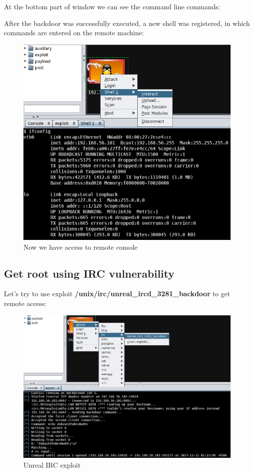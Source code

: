 \documentclass[14pt,a4paper,report]{report}
\begin{document}
At the bottom part of window we can see the command line commands:



\clearpage

After the backdoor was successfully executed, a new shell was registered, in which commands are entered on the remote machine:

\begin{figure}[h!]
	\centering
	\includegraphics[scale = 0.60]{images/7.png}
	\caption{Now we have access to remote console}
\end{figure}

\subsection{Get root using IRC vulnerability}

Let's try to use exploit \textbf{/unix/irc/unreal\_ircd\_3281\_backdoor} to get remote access:

\begin{figure}[h!]
	\centering
	\includegraphics[scale = 0.65]{images/8.png}
	\caption{Unreal IRC exploit}
\end{figure}
\end{document}
